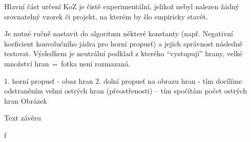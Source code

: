 Hlavní část určení KoZ je čistě experimentální, jelikož nebyl nalezen žádný srovnatelný vzorek či projekt, na kterém by šlo empiricky stavět.

Je nutné ručně nastavit do algoritmu některé konstanty (např. Negativní koeficient konvolučního jádra pro horní propusť) a jejich správnost následně testovat. Výsledkem je neutrální podklad z kterého “vystupují” hrany, velké množství hran ⇔ fotka není rozmazaná.


1. horní propusť - obaz hran
2. dolní propusť na obrazu hran - tím docílíme odstraněním velmi ostrých hran (přeostřenosti)
-- tím spočítám počet ostrých hran
Obrázek 






Text závěru


f